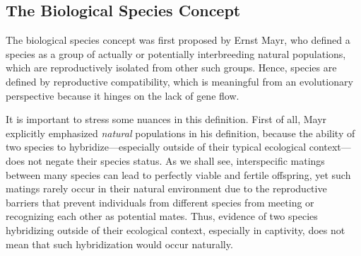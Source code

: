 \documentclass[
]{book}
\begin{document}
\hypertarget{the-biological-species-concept}{%
\subsection{The Biological Species Concept}\label{the-biological-species-concept}}

The biological species concept was first proposed by Ernst Mayr, who defined a species as a group of actually or potentially interbreeding natural populations, which are reproductively isolated from other such groups. Hence, species are defined by reproductive compatibility, which is meaningful from an evolutionary perspective because it hinges on the lack of gene flow.

It is important to stress some nuances in this definition. First of all, Mayr explicitly emphasized \emph{natural} populations in his definition, because the ability of two species to hybridize---especially outside of their typical ecological context---does not negate their species status. As we shall see, interspecific matings between many species can lead to perfectly viable and fertile offspring, yet such matings rarely occur in their natural environment due to the reproductive barriers that prevent individuals from different species from meeting or recognizing each other as potential mates. Thus, evidence of two species hybridizing outside of their ecological context, especially in captivity, does not mean that such hybridization would occur naturally.
\end{document}
